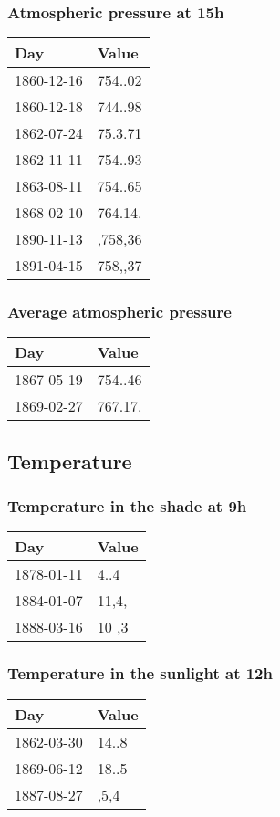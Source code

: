 \documentclass[]{article}
\begin{document}
\subsubsection{Atmospheric pressure at
15h}\label{atmospheric-pressure-at-15h}

\begin{longtable}[]{@{}ll@{}}
\toprule
Day & Value\tabularnewline
\midrule
\endhead
1860-12-16 & 754..02\tabularnewline
1860-12-18 & 744..98\tabularnewline
1862-07-24 & 75.3.71\tabularnewline
1862-11-11 & 754..93\tabularnewline
1863-08-11 & 754..65\tabularnewline
1868-02-10 & 764.14.\tabularnewline
1890-11-13 & ,758,36\tabularnewline
1891-04-15 & 758,,37\tabularnewline
\bottomrule
\end{longtable}

\subsubsection{Average atmospheric
pressure}\label{average-atmospheric-pressure}

\begin{longtable}[]{@{}ll@{}}
\toprule
Day & Value\tabularnewline
\midrule
\endhead
1867-05-19 & 754..46\tabularnewline
1869-02-27 & 767.17.\tabularnewline
\bottomrule
\end{longtable}

\subsection{Temperature}\label{temperature}

\subsubsection{Temperature in the shade at
9h}\label{temperature-in-the-shade-at-9h}

\begin{longtable}[]{@{}ll@{}}
\toprule
Day & Value\tabularnewline
\midrule
\endhead
1878-01-11 & 4..4\tabularnewline
1884-01-07 & 11,4,\tabularnewline
1888-03-16 & 10 ,3\tabularnewline
\bottomrule
\end{longtable}

\subsubsection{Temperature in the sunlight at
12h}\label{temperature-in-the-sunlight-at-12h}

\begin{longtable}[]{@{}ll@{}}
\toprule
Day & Value\tabularnewline
\midrule
\endhead
1862-03-30 & 14..8\tabularnewline
1869-06-12 & 18..5\tabularnewline
1887-08-27 & ,5,4\tabularnewline
\bottomrule
\end{longtable}
\end{document}
